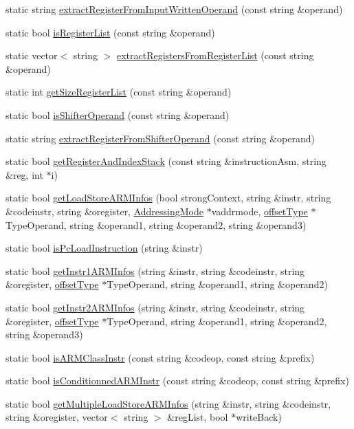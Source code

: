 \begin{DoxyCompactItemize}
static string \hyperlink{classArch_aff836e851e244ec98b8223f90a9b5742}{extract\+Register\+From\+Input\+Written\+Operand} (const string \&operand)
\item 
static bool \hyperlink{classArch_ae61d5eb0785fac7962ede07c619fc0bc}{is\+Register\+List} (const string \&operand)
\item 
static vector$<$ string $>$ \hyperlink{classArch_acb3c4868277968fb7ca1b5841bfc33a5}{extract\+Registers\+From\+Register\+List} (const string \&operand)
\item 
static int \hyperlink{classArch_a386c91cdb12d2a36af51dde5e0deb1e0}{get\+Size\+Register\+List} (const string \&operand)
\item 
static bool \hyperlink{classArch_ac5b9875dc1b688701498bbf6cde5d787}{is\+Shifter\+Operand} (const string \&operand)
\item 
static string \hyperlink{classArch_acbf901aa17d51e8b925888bf866f92b7}{extract\+Register\+From\+Shifter\+Operand} (const string \&operand)
\item 
static bool \hyperlink{classArch_aa364e6f5826999632dd128a19fc3d587}{get\+Register\+And\+Index\+Stack} (const string \&instruction\+Asm, string \&reg, int $\ast$i)
\item 
static bool \hyperlink{classArch_a05769e18b70c873d0eea0c9f220dabda}{get\+Load\+Store\+A\+R\+M\+Infos} (bool strong\+Context, string \&instr, string \&codeinstr, string \&oregister, \hyperlink{arch_8h_aa5cfff0cd9c5ad5ebda7aeecc4a50c2b}{Addressing\+Mode} $\ast$vaddrmode, \hyperlink{arch_8h_a63b66e201ffc27bbc8f89c8808382044}{offset\+Type} $\ast$Type\+Operand, string \&operand1, string \&operand2, string \&operand3)
\item 
static bool \hyperlink{classArch_ace290b0da62662b592bdfdf3e3c334c1}{is\+Pc\+Load\+Instruction} (string \&instr)
\item 
static bool \hyperlink{classArch_a3d4760d01a0a07e2d2c063baa991ac43}{get\+Instr1\+A\+R\+M\+Infos} (string \&instr, string \&codeinstr, string \&oregister, \hyperlink{arch_8h_a63b66e201ffc27bbc8f89c8808382044}{offset\+Type} $\ast$Type\+Operand, string \&operand1, string \&operand2)
\item 
static bool \hyperlink{classArch_a33a111fcd02dc3407328d37a38ad1bf8}{get\+Instr2\+A\+R\+M\+Infos} (string \&instr, string \&codeinstr, string \&oregister, \hyperlink{arch_8h_a63b66e201ffc27bbc8f89c8808382044}{offset\+Type} $\ast$Type\+Operand, string \&operand1, string \&operand2, string \&operand3)
\item 
static bool \hyperlink{classArch_a268deb415f38b6b4dec40ebb7ed5d00c}{is\+A\+R\+M\+Class\+Instr} (const string \&codeop, const string \&prefix)
\item 
static bool \hyperlink{classArch_a1ba2bb85ba1f4cb5e7d07506aa21397a}{is\+Conditionned\+A\+R\+M\+Instr} (const string \&codeop, const string \&prefix)
\item 
static bool \hyperlink{classArch_a2691fdefb6c6b0b7eb488564aa3f8db6}{get\+Multiple\+Load\+Store\+A\+R\+M\+Infos} (string \&instr, string \&codeinstr, string \&oregister, vector$<$ string $>$ \&reg\+List, bool $\ast$write\+Back)
\end{DoxyCompactItemize}


